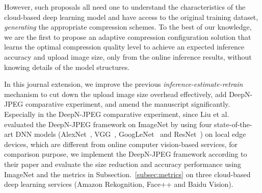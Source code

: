 However, such proposals all need one to understand the characteristics of the cloud-based deep learning model and have access to the original training dataset,  \emph{generating} the appropriate compression schemes. To the best of our knowledge, we are the first to propose an adaptive compression configuration solution that learns the optimal compression quality level to achieve an expected inference accuracy and upload image size, only from the online inference results, without knowing details of the model structures. 

In this journal extension, we improve the previous \emph{inference-estimate-retrain} mechanism to cut down the upload image size overhead effectively, add DeepN-JPEG comparative experiment, and amend the manuscript significantly. Especially in the DeepN-JPEG comparative experiment, since Liu et al.~\cite{DeepN-JPEG} evaluated the DeepN-JPEG framework on ImageNet by using four state-of-the-art DNN models (AlexNet~\cite{AlexNet-krizhevsky2012imagenet}, VGG~\cite{VGG-simonyan2014very}, GoogLeNet~\cite{GoogleNet-szegedy2015going} and ResNet~\cite{ResNet-he2016deep}) on local edge devices, which are different from online computer vision-based services, for comparison purpose, we implement the DeepN-JPEG framework according to their paper and evaluate the size reduction and accuracy performance using ImageNet and the metrics in Subsection.~\ref{subsec:metrics} on three cloud-based deep learning services (Amazon Rekognition, Face++ and Baidu Vision).

